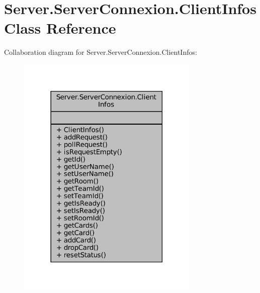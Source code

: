 \hypertarget{classServer_1_1ServerConnexion_1_1ClientInfos}{}\section{Server.\+Server\+Connexion.\+Client\+Infos Class Reference}
\label{classServer_1_1ServerConnexion_1_1ClientInfos}


Collaboration diagram for Server.\+Server\+Connexion.\+Client\+Infos\+:
\nopagebreak
\begin{figure}[H]
\begin{center}
\leavevmode
\includegraphics[width=246pt]{classServer_1_1ServerConnexion_1_1ClientInfos__coll__graph}
\end{center}
\end{figure}
